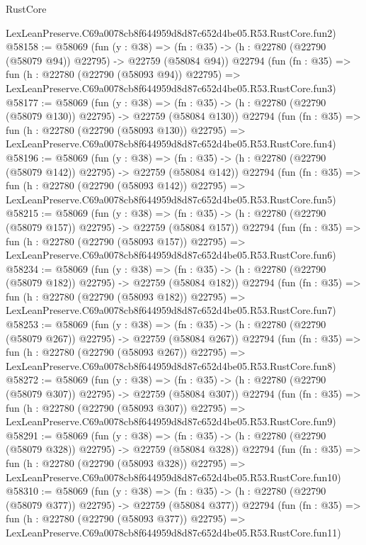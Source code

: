 \begin{lexlean}{RustCore}
\begin{coremodule}
    LexLeanPreserve.C69a0078cb8f644959d8d87c652d4be05.R53.RustCore.fun2)
@58158 := @58069
    (fun (y : @38) =>
    (fn : @35) -> (h : @22780 (@22790 (@58079 @94)) @22795) -> @22759 (@58084 @94))
    @22794
    (fun (fn : @35) =>
    fun (h : @22780 (@22790 (@58093 @94)) @22795) =>
    LexLeanPreserve.C69a0078cb8f644959d8d87c652d4be05.R53.RustCore.fun3)
@58177 := @58069
    (fun (y : @38) =>
    (fn : @35) -> (h : @22780 (@22790 (@58079 @130)) @22795) -> @22759 (@58084 @130))
    @22794
    (fun (fn : @35) =>
    fun (h : @22780 (@22790 (@58093 @130)) @22795) =>
    LexLeanPreserve.C69a0078cb8f644959d8d87c652d4be05.R53.RustCore.fun4)
@58196 := @58069
    (fun (y : @38) =>
    (fn : @35) -> (h : @22780 (@22790 (@58079 @142)) @22795) -> @22759 (@58084 @142))
    @22794
    (fun (fn : @35) =>
    fun (h : @22780 (@22790 (@58093 @142)) @22795) =>
    LexLeanPreserve.C69a0078cb8f644959d8d87c652d4be05.R53.RustCore.fun5)
@58215 := @58069
    (fun (y : @38) =>
    (fn : @35) -> (h : @22780 (@22790 (@58079 @157)) @22795) -> @22759 (@58084 @157))
    @22794
    (fun (fn : @35) =>
    fun (h : @22780 (@22790 (@58093 @157)) @22795) =>
    LexLeanPreserve.C69a0078cb8f644959d8d87c652d4be05.R53.RustCore.fun6)
@58234 := @58069
    (fun (y : @38) =>
    (fn : @35) -> (h : @22780 (@22790 (@58079 @182)) @22795) -> @22759 (@58084 @182))
    @22794
    (fun (fn : @35) =>
    fun (h : @22780 (@22790 (@58093 @182)) @22795) =>
    LexLeanPreserve.C69a0078cb8f644959d8d87c652d4be05.R53.RustCore.fun7)
@58253 := @58069
    (fun (y : @38) =>
    (fn : @35) -> (h : @22780 (@22790 (@58079 @267)) @22795) -> @22759 (@58084 @267))
    @22794
    (fun (fn : @35) =>
    fun (h : @22780 (@22790 (@58093 @267)) @22795) =>
    LexLeanPreserve.C69a0078cb8f644959d8d87c652d4be05.R53.RustCore.fun8)
@58272 := @58069
    (fun (y : @38) =>
    (fn : @35) -> (h : @22780 (@22790 (@58079 @307)) @22795) -> @22759 (@58084 @307))
    @22794
    (fun (fn : @35) =>
    fun (h : @22780 (@22790 (@58093 @307)) @22795) =>
    LexLeanPreserve.C69a0078cb8f644959d8d87c652d4be05.R53.RustCore.fun9)
@58291 := @58069
    (fun (y : @38) =>
    (fn : @35) -> (h : @22780 (@22790 (@58079 @328)) @22795) -> @22759 (@58084 @328))
    @22794
    (fun (fn : @35) =>
    fun (h : @22780 (@22790 (@58093 @328)) @22795) =>
    LexLeanPreserve.C69a0078cb8f644959d8d87c652d4be05.R53.RustCore.fun10)
@58310 := @58069
    (fun (y : @38) =>
    (fn : @35) -> (h : @22780 (@22790 (@58079 @377)) @22795) -> @22759 (@58084 @377))
    @22794
    (fun (fn : @35) =>
    fun (h : @22780 (@22790 (@58093 @377)) @22795) =>
    LexLeanPreserve.C69a0078cb8f644959d8d87c652d4be05.R53.RustCore.fun11)

\end{coremodule}
\end{lexlean}
